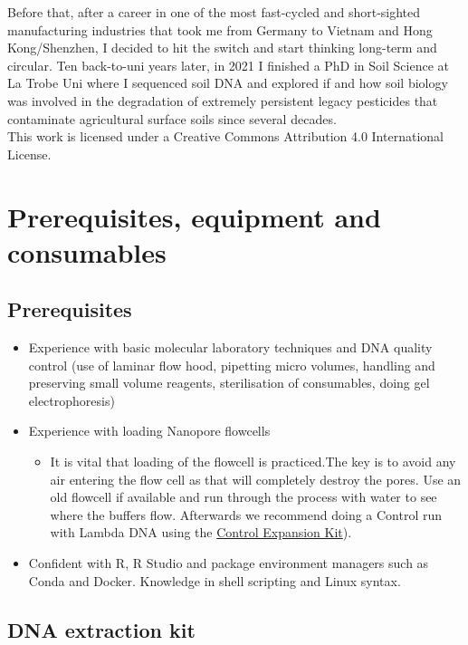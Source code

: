 \documentclass[
]{book}
\providecommand{\tightlist}{%
  \setlength{\itemsep}{0pt}\setlength{\parskip}{0pt}}
\begin{document}
Before that, after a career in one of the most fast-cycled and short-sighted manufacturing industries that took me from Germany to Vietnam and Hong Kong/Shenzhen, I decided to hit the switch and start thinking long-term and circular. Ten back-to-uni years later, in 2021 I finished a PhD in Soil Science at La Trobe Uni where I sequenced soil DNA and explored if and how soil biology was involved in the degradation of extremely persistent legacy pesticides that contaminate agricultural surface soils since several decades.\\

This work is licensed under a Creative Commons Attribution 4.0 International License.

\chapter{Prerequisites, equipment and consumables}\label{prerequisites}

\section{Prerequisites}\label{prerequisites-1}

\begin{itemize}
\tightlist
\item
  Experience with basic molecular laboratory techniques and DNA quality control (use of laminar flow hood, pipetting micro volumes, handling and preserving small volume reagents, sterilisation of consumables, doing gel electrophoresis)
\item
  Experience with loading Nanopore flowcells

  \begin{itemize}
  \tightlist
  \item
    It is vital that loading of the flowcell is practiced.The key is to avoid any air entering the flow cell as that will completely destroy the pores. Use an old flowcell if available and run through the process with water to see where the buffers flow. Afterwards we recommend doing a Control run with Lambda DNA using the \href{https://store.nanoporetech.com/control-expansion.html}{Control Expansion Kit}).
  \end{itemize}
\item
  Confident with R, R Studio and package environment managers such as Conda and Docker. Knowledge in shell scripting and Linux syntax.
\end{itemize}

\section{DNA extraction kit}\label{dna-extraction-kit}
\end{document}
